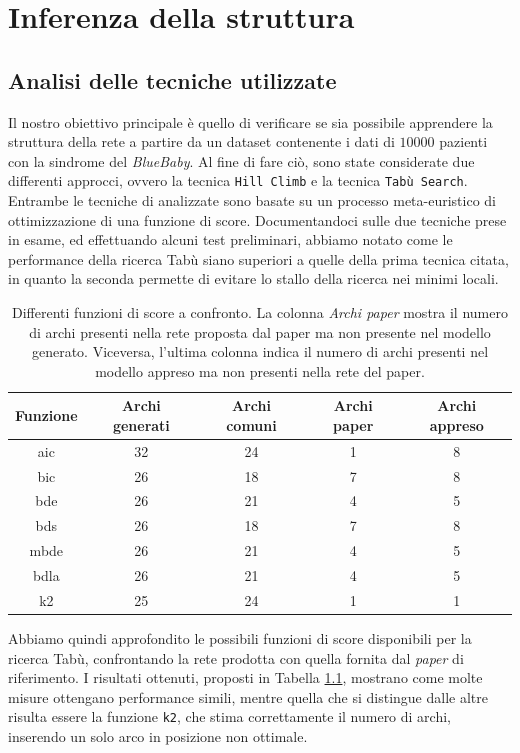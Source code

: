 \chapter{Inferenza della struttura}
\section{Analisi delle tecniche utilizzate}
\label{sec:misure}
Il nostro obiettivo principale è quello di verificare se sia possibile apprendere la struttura della rete a partire da un dataset contenente i dati di $10000$ pazienti con la sindrome del \textit{BlueBaby}. Al fine di fare ciò, sono state considerate due differenti approcci, ovvero la tecnica \texttt{Hill Climb} e la tecnica \texttt{Tabù Search}. Entrambe le tecniche di analizzate sono basate su un processo meta-euristico di ottimizzazione di una funzione di score. Documentandoci sulle due tecniche prese in esame, ed effettuando alcuni test preliminari, abbiamo notato come le performance della ricerca Tabù siano superiori a quelle della prima tecnica citata, in quanto la seconda permette di evitare lo stallo della ricerca nei minimi locali.\\
\begin{table}[t!]
	\centering
	\caption{Differenti funzioni di score a confronto. La colonna \textit{Archi paper} mostra il numero di archi presenti nella rete proposta dal paper ma non presente nel modello generato. Viceversa, l'ultima colonna indica il numero di archi presenti nel modello appreso ma non presenti nella rete del paper.}
	\begin{tabular}{|c|c|c|c|c|}
		\hline 
		Funzione & Archi generati  & Archi comuni & Archi paper & Archi appreso \\ 
		\hline 
		aic & 32 & 24 & 1 & 8 \\ 
		\hline 
		bic & 26 & 18 & 7 & 8 \\ 
		\hline 
		bde & 26 & 21 & 4 & 5 \\ 
		\hline 
		bds & 26 & 18 & 7 & 8 \\ 
		\hline 
		mbde & 26 & 21 & 4 & 5 \\ 
		\hline 
		bdla & 26 & 21 & 4 & 5 \\ 
		\hline 
		k2 & 25 & 24 & 1 & 1 \\ 
		\hline 
	\end{tabular} 
	\label{tab:score}
\end{table}
Abbiamo quindi approfondito le possibili funzioni di score disponibili per la ricerca Tabù, confrontando la rete prodotta con quella fornita dal \textit{paper} di riferimento. I risultati ottenuti, proposti in Tabella \ref{tab:score}, mostrano come molte misure ottengano performance simili, mentre quella che si distingue dalle altre risulta essere la funzione \texttt{k2}, che stima correttamente il numero di archi, inserendo un solo arco in posizione non ottimale.

